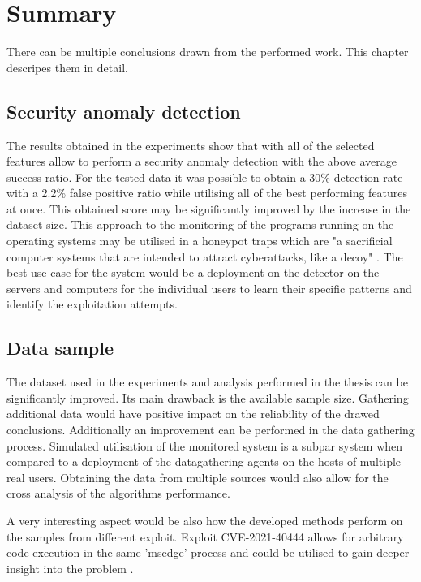\documentclass[a4paper,twoside,12pt]{book}
\begin{document}

\chapter{Summary}

There can be multiple conclusions drawn from the performed work. This chapter descripes them in 
detail.

\section{Security anomaly detection}

The results obtained in the experiments show that with all of the selected features allow 
to perform a security anomaly detection with the above average success ratio. For the tested
data it was possible to obtain a 30\% detection rate with a 2.2\% false positive ratio while
utilising all of the best performing features at once. This obtained score may be significantly 
improved by the increase in the dataset size. This approach to the monitoring of the programs 
running on the operating systems may be utilised in a honeypot traps which are "a sacrificial 
computer systems that are intended to attract cyberattacks, like a decoy" \cite{bib:Honeypot}. 
The best use case for the system would be a deployment on the detector on the servers and 
computers for the individual users to learn their specific patterns and identify the exploitation
attempts.

\section{Data sample}

The dataset used in the experiments and analysis performed in the thesis can be significantly 
improved. Its main drawback is the available sample size. Gathering additional data would have
positive impact on the reliability of the drawed conclusions. Additionally an improvement 
can be performed in the data gathering process. Simulated utilisation of the monitored system
is a subpar system when compared to a deployment of the datagathering agents on the hosts of 
multiple real users. Obtaining the data from multiple sources would also allow for the cross
analysis of the algorithms performance. 

A very interesting aspect would be also how the developed methods perform on the samples from 
different exploit. Exploit CVE-2021-40444 allows for arbitrary code execution in the same 'msedge'
process and could be utilised to gain deeper insight into the problem \cite{bib:newEdgeExploit}.
\end{document}
